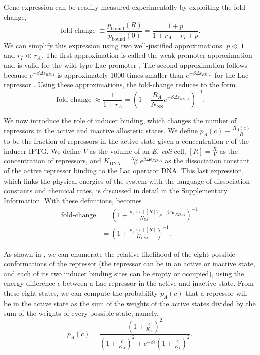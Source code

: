 \documentclass[10pt,letterpaper]{article}
\newcommand \foldchange{\operatorname{fold-change}}
\newcommand{\K}{K_{\text{DNA}}}
\begin{document}
Gene expression can be readily measured experimentally by exploiting the fold-change, 
\begin{equation}\label{eq3}
\foldchange\equiv \frac{p_{\text{bound}}(R)}{p_{\text{bound}}(0)}=\frac{1+p}{1+r_A+r_I+p}.
\end{equation}
We can simplify this expression using two well-justified approximations: \(p\ll
1\) and \(r_I\ll r_A\). The first approximation is called the weak promoter
approximation and is valid for the wild type Lac promoter \cite{Brewster2012}.
The second approximation follows because $e^{-\beta  \Delta\epsilon _{RD,I}}$ is
approximately 1000 times smaller than $e^{-\beta \Delta\epsilon _{RD,A}}$ for
the Lac repressor \cite{Daber2011a}. Using these approximations, the fold-change
reduces to the form
\begin{equation}\label{eq4}
\foldchange\approx \frac{1}{1+r_A}=\left(1+\frac{R_A}{N_{\text{NS}}}e^{-\beta  \Delta\epsilon _{RD,A}}\right)^{-1}.
\end{equation}

We now introduce the role of inducer binding, which changes the number of
repressors in the active and inactive allosteric states. We define \(p_A(c)
\equiv \frac{R_A(c)}{R}\) to be the fraction of repressors in the active state
given a concentration \(c\) of the inducer IPTG. We define \(V\) as the volume
of an \textit{E. coli} cell, \([R]=\frac{R}{V}\) as the concentration of
repressors, and \(\K=\frac{N_{\text{NS}}}{V}e^{\beta \Delta\epsilon _{RD,A}}\)
as the dissociation constant of the active repressor binding to the Lac operator
DNA. This last expression, which links the physical energies of the system with
the language of dissociation constants and chemical rates, is discussed in
detail in the Supplementary Information. With these definitions, \eref[eq4]
becomes
\begin{align}
\foldchange &= \left( 1+\frac{p_A(c) [R] V}{N_{\text{NS}}}e^{-\beta  \Delta\epsilon
	_{RD,A}} \right)^{-1} \nonumber \\
&= \left( 1+\frac{p_A(c) [R]}{\K} \right)^{-1}. \label{eq5}
\end{align}

As shown in \fref[figrepressorInducerStates], we can enumerate the relative
likelihood of the eight possible conformations of the repressor (the repressor
can be in an active or inactive state, and each of its two inducer binding sites
can be empty or occupied), using the energy difference $\epsilon$ between a Lac
repressor in the active and inactive state. From these eight states, we can
compute the probability \(p_A(c)\) that a repressor will be in the active state
as the sum of the weights of the active states divided by the sum of the weights
of every possible state, namely,
\begin{equation}\label{eq6}
p_A(c)=\frac{\left(1+\frac{c}{K_A}\right)^2}{\left(1+\frac{c}{K_A}\right)^2+e^{-\beta  \epsilon }\left(1+\frac{c}{K_I}\right)^2}.
\end{equation}
\end{document}
